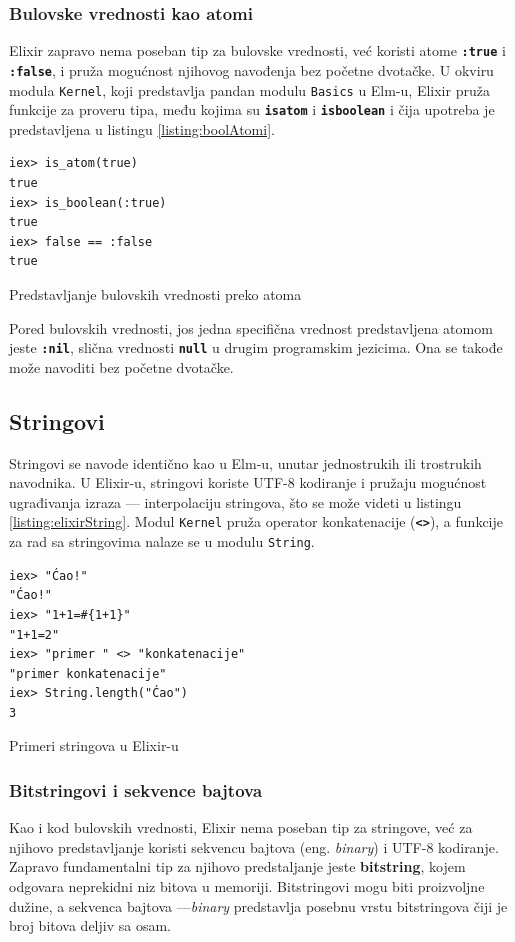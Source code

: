 \documentclass[12pt,oneside]{memoir}
\begin{document}
\subsubsection{Bulovske vrednosti kao atomi}
Elixir zapravo nema poseban tip za bulovske vrednosti, već koristi atome \texttt{\textbf{:true}}
i \texttt{\textbf{:false}}, i pruža mogućnost njihovog navođenja bez početne dvotačke. U okviru
modula \texttt{Kernel}, koji predstavlja pandan modulu \texttt{Basics} u Elm-u, Elixir pruža
funkcije za proveru tipa, među kojima su \texttt{\textbf{is{\textunderscore}atom}} i
\texttt{\textbf{is{\textunderscore}boolean}} i čija upotreba je predstavljena u listingu
\ref{listing:boolAtomi}.
\begin{listing}[!h]
\begin{verbatim}
iex> is_atom(true)
true
iex> is_boolean(:true)
true
iex> false == :false
true
\end{verbatim}
\caption{Predstavljanje bulovskih vrednosti preko atoma}
\label{listing:boolAtomi}
\end{listing}

Pored bulovskih vrednosti, jos jedna specifična vrednost predstavljena atomom jeste
\texttt{\textbf{:nil}}, slična vrednosti \texttt{\textbf{null}} u drugim programskim jezicima.
Ona se takođe može navoditi bez početne dvotačke.
\subsection{Stringovi}
Stringovi se navode identično kao u Elm-u, unutar jednostrukih ili trostrukih navodnika. 
U Elixir-u, stringovi koriste UTF-8 kodiranje i pružaju mogućnost ugrađivanja izraza --- interpolaciju
stringova, što se može videti u listingu \ref{listing:elixirString}. Modul \texttt{Kernel}
pruža operator konkatenacije (\texttt{\textbf{<>}}), a funkcije za rad sa stringovima nalaze
se u modulu \texttt{String}.
\begin{listing}[!h]
\begin{verbatim}
iex> "Ćao!"
"Ćao!"
iex> "1+1=#{1+1}"
"1+1=2"
iex> "primer " <> "konkatenacije"
"primer konkatenacije"
iex> String.length("Ćao")
3
\end{verbatim}
\caption{Primeri stringova u Elixir-u}
\label{listing:elixirString}
\end{listing}
\subsubsection{Bitstringovi i sekvence bajtova}
Kao i kod bulovskih vrednosti, Elixir nema poseban tip za stringove, već za njihovo
predstavljanje koristi sekvencu bajtova (eng. \emph{binary}) i UTF-8 kodiranje.
Zapravo fundamentalni tip za njihovo predstaljanje jeste \textbf{bitstring}, kojem odgovara 
neprekidni niz bitova u memoriji. Bitstringovi mogu biti proizvoljne dužine, a sekvenca
bajtova ---\emph{binary} predstavlja posebnu vrstu bitstringova čiji je broj bitova deljiv sa
osam. 
\end{document}
